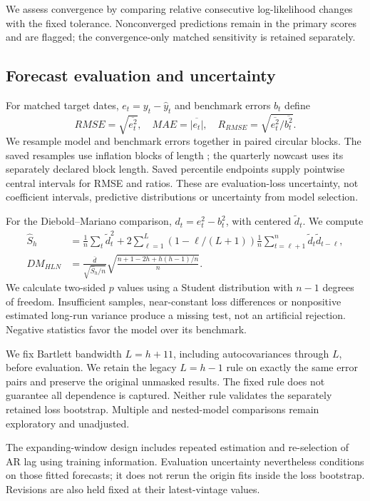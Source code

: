 We assess convergence by comparing relative consecutive log-likelihood changes with the fixed tolerance. Nonconverged predictions remain in the primary scores and are flagged; the convergence-only matched sensitivity is retained separately.
\subsection{Forecast evaluation and uncertainty}
For matched target dates, $e_t=y_t-\widehat y_t$ and benchmark errors $b_t$ define
\begin{equation}
 RMSE=\sqrt{\overline{e_t^2}},\quad MAE=\overline{|e_t|},\quad
 R_{RMSE}=\sqrt{\overline{e_t^2}/\overline{b_t^2}}.
\end{equation}
We resample model and benchmark errors together in paired circular blocks. The saved \LossDraws{} resamples use inflation blocks of length \LossBlock{}; the quarterly nowcast uses its separately declared block length. Saved percentile endpoints supply pointwise central intervals for RMSE and ratios. These are evaluation-loss uncertainty, not coefficient intervals, predictive distributions or uncertainty from model selection.

For the Diebold--Mariano comparison, $d_t=e_t^2-b_t^2$, with centered $\widetilde d_t$. We compute
\begin{align}
 \widehat S_h&=\frac{1}{n}\sum_t\widetilde d_t^2
 +2\sum_{\ell=1}^{L}(1-\ell/(L+1))\frac{1}{n}\sum_{t=\ell+1}^{n}\widetilde d_t\widetilde d_{t-\ell},\\
 DM_{HLN}&=\frac{\overline d}{\sqrt{\widehat S_h/n}}
 \sqrt{\frac{n+1-2h+h(h-1)/n}{n}}.
\end{align}
We calculate two-sided $p$ values using a Student distribution with $n-1$ degrees of freedom. Insufficient samples, near-constant loss differences or nonpositive estimated long-run variance produce a missing test, not an artificial rejection. Negative statistics favor the model over its benchmark.

We fix Bartlett bandwidth $L=h+11$, including autocovariances through $L$, before evaluation. We retain the legacy $L=h-1$ rule on exactly the same error pairs and preserve the original unmasked results. The fixed rule does not guarantee all dependence is captured. Neither rule validates the separately retained loss bootstrap. Multiple and nested-model comparisons remain exploratory and unadjusted.

The expanding-window design includes repeated estimation and re-selection of AR lag using training information. Evaluation uncertainty nevertheless conditions on those fitted forecasts; it does not rerun the origin fits inside the loss bootstrap. Revisions are also held fixed at their latest-vintage values.
